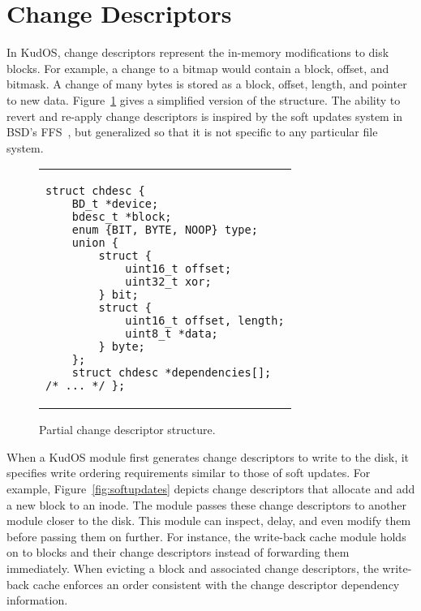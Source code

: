 \preparagraphspacing{}
\section*{Change Descriptors}
\label{sec:chdescs}

In KudOS, change descriptors represent the in-memory modifications to
disk blocks. For example, a change to a bitmap would contain a block,
offset, and bitmask. A change of many bytes is stored as a block,
offset, length, and pointer to new data. Figure~\ref{fig:chdesc} gives
a simplified version of the structure. The ability to revert and
re-apply change descriptors is inspired by the soft updates system in
BSD's FFS~\cite{ganger00soft}, but generalized so that it is not
specific to any particular file system.

\begin{figure}
\vskip-14pt
\begin{tabular}{@{\hskip0.58in}p{2in}@{}}
\begin{scriptsize}
\begin{verbatim}
struct chdesc {
    BD_t *device;
    bdesc_t *block;
    enum {BIT, BYTE, NOOP} type;
    union {
        struct {
            uint16_t offset;
            uint32_t xor;
        } bit;
        struct {
            uint16_t offset, length;
            uint8_t *data;
        } byte;
    };
    struct chdesc *dependencies[];
/* ... */ };
\end{verbatim}
\end{scriptsize}
\end{tabular}
\vspace{-10pt}
\caption{\label{fig:chdesc} Partial change descriptor structure.}
\end{figure}

When a KudOS module first generates change descriptors to write to the disk, it
specifies write ordering requirements similar to those of soft updates. For
example, Figure~\ref{fig:softupdates} depicts change descriptors that allocate
and add a new block to an inode.
%
The module passes these change descriptors to another module closer to
the disk.  This module can inspect, delay, and even modify them before
passing them on further.
%
For instance, the write-back cache module holds on to blocks and their change
descriptors instead of forwarding them immediately.
%
When evicting a block and associated change descriptors, the write-back
cache enforces an order consistent with the change descriptor dependency
information.

